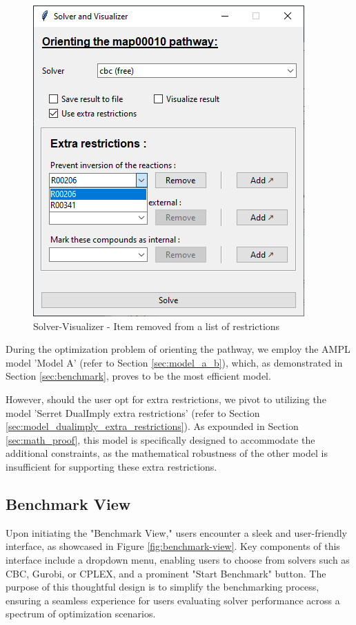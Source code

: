 \begin{figure}[H]
    \centering
    \includegraphics[width=0.5\linewidth]{Design of the User Interface/extra_remove.png}
    \caption{Solver-Visualizer - Item removed from a list of restrictions}
    \label{fig:extra_remove}
\end{figure}

During the optimization problem of orienting the pathway, we employ the AMPL model 'Model A' (refer to Section \ref{sec:model_a_b}), which, as demonstrated in Section \ref{sec:benchmark}, proves to be the most efficient model.

However, should the user opt for extra restrictions, we pivot to utilizing the model 'Serret DualImply extra restrictions' (refer to Section \ref{sec:model_dualimply_extra_restrictions}). As expounded in Section \ref{sec:math_proof}, this model is specifically designed to accommodate the additional constraints, as the mathematical robustness of the other model is insufficient for supporting these extra restrictions.


\subsection{Benchmark View} \label{sec:benchmark_view}

Upon initiating the "Benchmark View," users encounter a sleek and user-friendly interface, as showcased in Figure \ref{fig:benchmark-view}. Key components of this interface include a dropdown menu, enabling users to choose from solvers such as CBC, Gurobi, or CPLEX, and a prominent "Start Benchmark" button. The purpose of this thoughtful design is to simplify the benchmarking process, ensuring a seamless experience for users evaluating solver performance across a spectrum of optimization scenarios.

